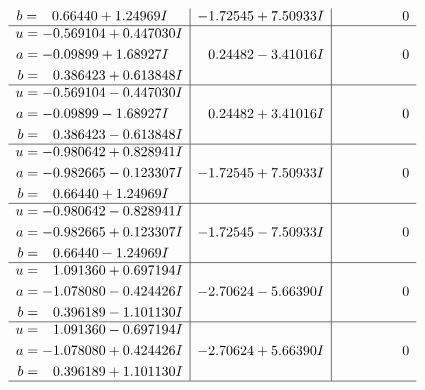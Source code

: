 \documentclass[1p]{elsarticle_modified}
\theoremstyle{definition}
\begin{document}
$$\begin{array}{c|c|c}
\begin{aligned}
b &= \phantom{-}0.66440 + 1.24969 I\end{aligned}
 & -1.72545 + 7.50933 I & \phantom{-0.000000 } 0 \\ \hline\begin{aligned}
u &= -0.569104 + 0.447030 I \\
a &= -0.09899 + 1.68927 I \\
b &= \phantom{-}0.386423 + 0.613848 I\end{aligned}
 & \phantom{-}0.24482 - 3.41016 I & \phantom{-0.000000 } 0 \\ \hline\begin{aligned}
u &= -0.569104 - 0.447030 I \\
a &= -0.09899 - 1.68927 I \\
b &= \phantom{-}0.386423 - 0.613848 I\end{aligned}
 & \phantom{-}0.24482 + 3.41016 I & \phantom{-0.000000 } 0 \\ \hline\begin{aligned}
u &= -0.980642 + 0.828941 I \\
a &= -0.982665 - 0.123307 I \\
b &= \phantom{-}0.66440 + 1.24969 I\end{aligned}
 & -1.72545 + 7.50933 I & \phantom{-0.000000 } 0 \\ \hline\begin{aligned}
u &= -0.980642 - 0.828941 I \\
a &= -0.982665 + 0.123307 I \\
b &= \phantom{-}0.66440 - 1.24969 I\end{aligned}
 & -1.72545 - 7.50933 I & \phantom{-0.000000 } 0 \\ \hline\begin{aligned}
u &= \phantom{-}1.091360 + 0.697194 I \\
a &= -1.078080 - 0.424426 I \\
b &= \phantom{-}0.396189 - 1.101130 I\end{aligned}
 & -2.70624 - 5.66390 I & \phantom{-0.000000 } 0 \\ \hline\begin{aligned}
u &= \phantom{-}1.091360 - 0.697194 I \\
a &= -1.078080 + 0.424426 I \\
b &= \phantom{-}0.396189 + 1.101130 I\end{aligned}
 & -2.70624 + 5.66390 I & \phantom{-0.000000 } 0\\
 \hline 
 \end{array}$$\newpage$$\begin{array}{c|c|c}  

\end{array}$$
\end{document}
